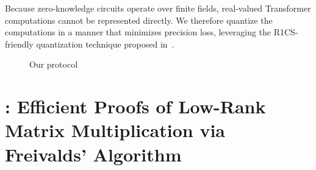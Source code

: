 \documentclass[letterpaper,twocolumn,10pt]{article}
\begin{document}
Because zero-knowledge circuits operate over finite fields, real-valued Transformer computations cannot be represented directly. We therefore quantize the computations in a manner that minimizes precision loss, leveraging the R1CS-friendly quantization technique proposed in~\cite{ZEN}.



\begin{figure}[!ht]
\center
{}
    \caption{Our protocol}
    \label{fig:protocol}
\end{figure}
\section{\name: Efficient Proofs of Low-Rank Matrix Multiplication via Freivalds' Algorithm}
\end{document}
